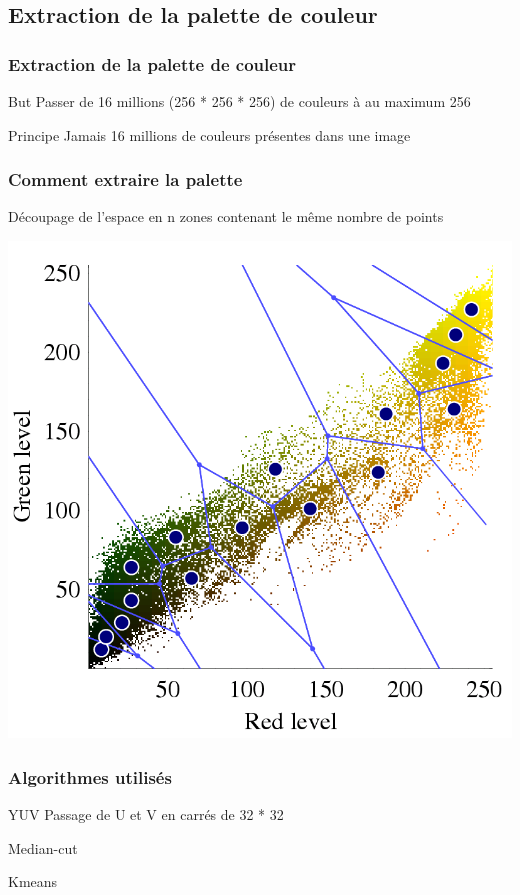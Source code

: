 \documentclass{beamer}
\begin{document}
\subsection{Extraction de la palette de couleur}
\begin{frame}
  \frametitle{Extraction de la palette de couleur}
  \begin{block}{But}
    Passer de 16 millions (256 * 256 * 256) de couleurs à au maximum 256
  \end{block}
  \begin{block}{Principe}
    Jamais 16 millions de couleurs présentes dans une image
  \end{block}
\end{frame}
\begin{frame}
  \frametitle{Comment extraire la palette}
  \begin{block}{}
    Découpage de l'espace en n zones contenant le même nombre de points
  \end{block}
  \begin{center}
    \includegraphics[scale=0.2]{cluster.png}
  \end{center}
\end{frame}
\begin{frame}
  \frametitle{Algorithmes utilisés}
  \begin{block}{YUV}
    Passage de U et V en carrés de 32 * 32
  \end{block}
  \begin{block}{Median-cut}

  \end{block}
  \begin{block}{Kmeans}

  \end{block}
\end{frame}
\end{document}
